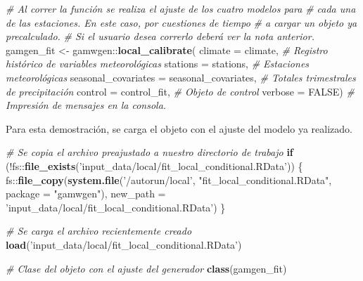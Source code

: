 \documentclass[
  12pt]{article}
\newenvironment{Shaded}{}{}
\newcommand{\CommentTok}[1]{\textcolor[rgb]{0.38,0.63,0.69}{\textit{#1}}}
\newcommand{\ControlFlowTok}[1]{\textcolor[rgb]{0.00,0.44,0.13}{\textbf{#1}}}
\newcommand{\DataTypeTok}[1]{\textcolor[rgb]{0.56,0.13,0.00}{#1}}
\newcommand{\KeywordTok}[1]{\textcolor[rgb]{0.00,0.44,0.13}{\textbf{#1}}}
\newcommand{\NormalTok}[1]{#1}
\newcommand{\OperatorTok}[1]{\textcolor[rgb]{0.40,0.40,0.40}{#1}}
\newcommand{\OtherTok}[1]{\textcolor[rgb]{0.00,0.44,0.13}{#1}}
\newcommand{\StringTok}[1]{\textcolor[rgb]{0.25,0.44,0.63}{#1}}
\begin{document}
\begin{Shaded}
\begin{Highlighting}[]
\CommentTok{# Al correr la función se realiza el ajuste de los cuatro modelos para }
\CommentTok{# cada una de las estaciones. En este caso, por cuestiones de tiempo }
\CommentTok{# a cargar un objeto ya precalculado. }
\CommentTok{# Si el usuario desea correrlo deberá ver la nota anterior.}
\NormalTok{gamgen_fit <-}\StringTok{ }\NormalTok{gamwgen}\OperatorTok{::}\KeywordTok{local_calibrate}\NormalTok{(}
  \DataTypeTok{climate =}\NormalTok{ climate, }
  \CommentTok{# Registro histórico de variables meteorológicas}
  \DataTypeTok{stations =}\NormalTok{ stations, }
  \CommentTok{# Estaciones meteorológicas }
  \DataTypeTok{seasonal_covariates =}\NormalTok{ seasonal_covariates, }
  \CommentTok{# Totales trimestrales de precipitación}
  \DataTypeTok{control =}\NormalTok{ control_fit, }
  \CommentTok{# Objeto de control}
  \DataTypeTok{verbose =} \OtherTok{FALSE}\NormalTok{) }
 \CommentTok{# Impresión de mensajes en la consola.}
\end{Highlighting}
\end{Shaded}

Para esta demostración, se carga el objeto con el ajuste del modelo ya realizado.

\begin{Shaded}
\begin{Highlighting}[]
\CommentTok{# Se copia el archivo preajustado a nuestro directorio de trabajo}
\ControlFlowTok{if}\NormalTok{ (}\OperatorTok{!}\NormalTok{fs}\OperatorTok{::}\KeywordTok{file_exists}\NormalTok{(}\StringTok{'input_data/local/fit_local_conditional.RData'}\NormalTok{)) \{}
\NormalTok{  fs}\OperatorTok{::}\KeywordTok{file_copy}\NormalTok{(}\KeywordTok{system.file}\NormalTok{(}\StringTok{'/autorun/local'}\NormalTok{, }\StringTok{"fit_local_conditional.RData"}\NormalTok{, }
                            \DataTypeTok{package =} \StringTok{"gamwgen"}\NormalTok{),}
                \DataTypeTok{new_path =} \StringTok{'input_data/local/fit_local_conditional.RData'}\NormalTok{)}
\NormalTok{\}}

\CommentTok{# Se carga el archivo recientemente creado}
\KeywordTok{load}\NormalTok{(}\StringTok{'input_data/local/fit_local_conditional.RData'}\NormalTok{)}

\CommentTok{# Clase del objeto con el ajuste del generador}
\KeywordTok{class}\NormalTok{(gamgen_fit)}
\end{Highlighting}
\end{Shaded}
\end{document}
